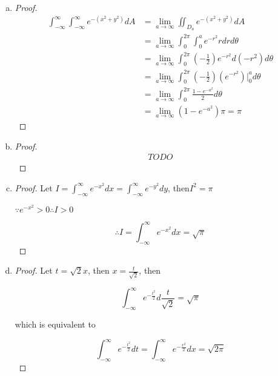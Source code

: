\documentclass{article}
\begin{document}
  \begin{enumerate}[(a)]
    \item 

    \begin{proof}
      $$\begin{aligned}
        \int_{-\infty}^{\infty} \int_{-\infty}^{\infty} e^{-(x^2+y^2)} dA &= \lim_{a\to \infty}\iint_{D_a} e^{-(x^2+y^2)} dA\\
        &= \lim_{a \to \infty} \int_0^{2\pi} \int_0^a e^{-r^2} r dr d\theta \\
        &= \lim_{a \to \infty} \int_0^{2\pi} (-\frac 1 2) e^{-r^2}d(-r^2) d\theta \\
        &= \lim_{a \to \infty} \int_0^{2\pi} (-\frac 1 2)(e^{-r^2})\biggl|_{0}^{a} d\theta \\
        &= \lim_{a \to \infty} \int_0^{2\pi} \frac{1 - e^{-a^2}}{2} d\theta \\
        &= \lim_{a \to \infty} (1-e^{-a^2}) \pi = \pi
      \end{aligned}$$
    \end{proof}

    \item

    \begin{proof}
      $$\begin{aligned}
        TODO
      \end{aligned}$$
    \end{proof}

    \item 

    \begin{proof}
      Let $I = \int_{-\infty}^\infty e^{-x^2} dx = \int_{-\infty}^\infty e^{-y^2} dy$, then$I^2 = \pi$

      $\because e^{-x^2} > 0 \therefore I > 0$

      $$\therefore I = \int_{-\infty}^\infty e^{-x^2} dx = \sqrt \pi$$
    \end{proof}

    \item 
    \begin{proof}
      Let $t = \sqrt 2 x$, then $x = \frac{t}{\sqrt 2}$, then

      $$\int_{-\infty}^\infty e^{-\frac{t^2}{2}} d\frac{t}{\sqrt 2} = \sqrt \pi$$

      which is equivalent to

      $$\int_{-\infty}^\infty e^{-\frac{t^2}{2}} dt = \int_{-\infty}^\infty e^{-\frac{x^2}{2}} dx = \sqrt{2\pi}$$
    \end{proof}

  \end{enumerate}
\end{document}
